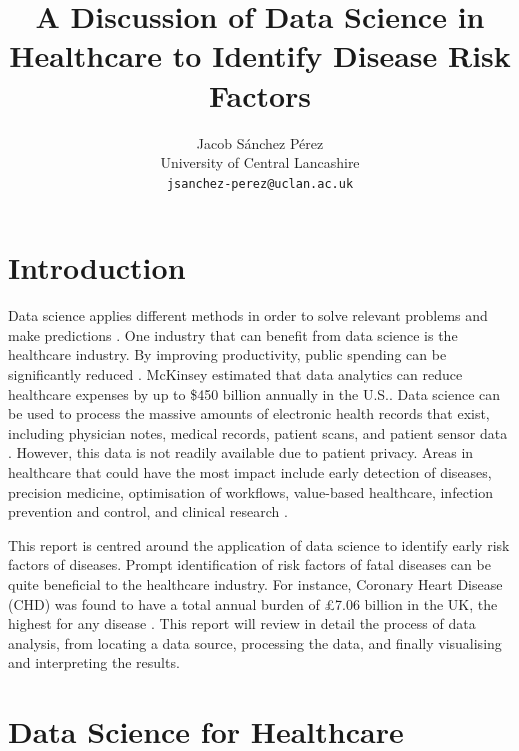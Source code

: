 \documentclass[a4paper,12pt]{article}
\title{A Discussion of Data Science in Healthcare to Identify Disease Risk Factors}
\author{Jacob Sánchez Pérez\\ University of Central Lancashire\\\texttt{jsanchez-perez@uclan.ac.uk}}
\date{}
\begin{document}
\maketitle


\section{Introduction}



Data science applies different methods in order to solve relevant problems and
make predictions \parencite[78]{Waller2013}.
One industry that can benefit from data science is the healthcare industry.
By improving productivity, public spending can be significantly reduced \parencite{oecd2010health}.
McKinsey estimated that data analytics can reduce healthcare expenses by up to
\$450 billion annually in the U.S.\parencite{Groves2013}.
Data science can be used to process the massive amounts of electronic health
records that exist, including physician notes, medical records, patient scans,
and patient sensor data \parencite{Adam2017, Dalianis2015}.
However, this data is not readily available due to patient privacy.
Areas in healthcare that could have the most impact include early detection of
diseases, precision medicine, optimisation of workflows, value-based healthcare,
infection prevention and control, and clinical research \parencite[9]{Consoli2019}.

This report is centred around the application of data science to identify early
risk factors of diseases.
Prompt identification of risk factors of fatal diseases can be quite beneficial
to the healthcare industry.
For instance, Coronary Heart Disease (CHD) was found to have a total annual
burden of £7.06 billion in the UK, the highest for any disease \parencite{Liu2002}.
This report will review in detail the process of data analysis, from locating a
data source, processing the data, and finally visualising and interpreting the results.

\section{Data Science for Healthcare}

\end{document}
